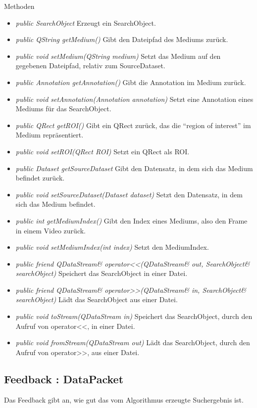 Methoden
\begin{itemize}
\item \textit{public SearchObject} Erzeugt ein SearchObject.
\item \textit{public QString getMedium()} Gibt den Dateipfad des Mediums zurück.
\item \textit{public void setMedium(QString medium)} Setzt das Medium auf den gegebenen Dateipfad, relativ zum SourceDataset.
\item \textit{public Annotation getAnnotation()} Gibt die Annotation im Medium zurück.
\item \textit{public void setAnnotation(Annotation annotation)} Setzt eine Annotation eines Mediums für das SearchObject.
\item \textit{public QRect getROI()} Gibt ein QRect zurück, das die \enquote{region of interest} im Medium repräsentiert.
\item \textit{public void setROI(QRect ROI)} Setzt ein QRect als ROI.
\item \textit{public Dataset getSourceDataset} Gibt den Datensatz, in dem sich das Medium befindet zurück.
\item \textit{public void setSourceDataset(Dataset dataset)} Setzt den Datensatz, in dem sich das Medium befindet.
\item \textit{public int getMediumIndex()} Gibt den Index eines Mediums, also den Frame in einem Video zurück.
\item \textit{public void setMediumIndex(int index)} Setzt den MediumIndex.
\item \textit{public friend QDataStream\& operator<<(QDataStream\& out, SearchObject\& searchObject)} Speichert das SearchObject in einer Datei.
\item \textit{public friend QDataStream\& operator>>(QDataStream\& in, SearchObject\& searchObject)} Lädt das SearchObject aus einer Datei.
\item \textit{public void toStream(QDataStream in)} Speichert das SearchObject, durch den Aufruf von operator<<, in einer Datei.
\item \textit{public void fromStream(QDataStream out)} Lädt das SearchObject, durch den Aufruf von operator>>, aus einer Datei.
\end{itemize}

\subsection*{Feedback : DataPacket}
Das Feedback gibt an, wie gut das vom Algorithmus erzeugte Suchergebnis ist.

